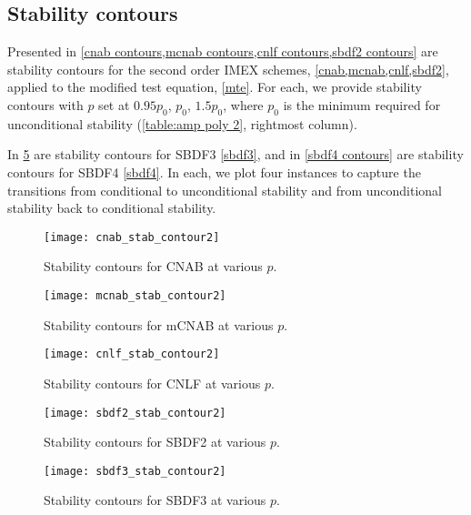 \subsection{Stability contours}
Presented in \cref{cnab contours,mcnab contours,cnlf contours,sbdf2 contours} are stability contours for the second order IMEX schemes, \cref{cnab,mcnab,cnlf,sbdf2}, applied to the modified test equation, \cref{mte}. For each, we provide stability contours with $p$ set at $0.95p_0$, $p_0$, $1.5p_0$, where $p_0$ is the minimum required for unconditional stability (\cref{table:amp poly 2}, rightmost column). 

In \cref{sbdf3 contours} are stability contours for SBDF3 \cref{sbdf3}, and in \cref{sbdf4 contours} are stability contours for SBDF4 \cref{sbdf4}. In each, we plot four instances to capture the transitions from conditional to unconditional stability and from unconditional stability back to conditional stability.
\begin{figure}[htb!]
        \centering
\texttt{[image: cnab\_stab\_contour2]}
\caption[Stability contours for CNAB at various $p$]{Stability contours for CNAB at various $p$.}
\label{cnab contours}
\end{figure}
\begin{figure}[htb!]
        \centering
\texttt{[image: mcnab\_stab\_contour2]}
\caption[Stability contours for mCNAB at various $p$]{Stability contours for mCNAB at various $p$.}
\label{mcnab contours}
\end{figure}
\begin{figure}[htb!]
        \centering
\texttt{[image: cnlf\_stab\_contour2]}
\caption[Stability contours for CNLF at various $p$]{Stability contours for CNLF at various $p$.}
\label{cnlf contours}
\end{figure}
\begin{figure}[htb!]
        \centering
\texttt{[image: sbdf2\_stab\_contour2]}
\caption[Stability contours for SBDF2 at various $p$]{Stability contours for SBDF2 at various $p$.}
\label{sbdf2 contours}
\end{figure}

\begin{figure}[htb!]
        \centering
\texttt{[image: sbdf3\_stab\_contour2]}
\caption[Stability contours for SBDF3 at various $p$]{Stability contours for SBDF3 at various $p$.}
\label{sbdf3 contours}
\end{figure}

